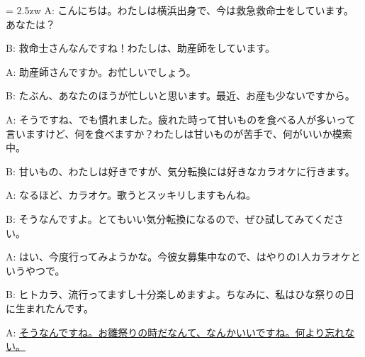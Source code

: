 \documentclass[11pt]{amsart}
\title{}
\author{}
\newenvironment{hangall}[1]{\hangindent = 2.5zw\everypar{\hangindent = 2.5zw}}{}
\begin{document}
\maketitle
\begin{hangall}{}%
A: こんにちは。わたしは横浜出身で、今は救急救命士をしています。あなたは？

B: 救命士さんなんですね！わたしは、助産師をしています。

A: 助産師さんですか。お忙しいでしょう。

B: たぶん、あなたのほうが忙しいと思います。最近、お産も少ないですから。

A: そうですね、でも慣れました。疲れた時って甘いものを食べる人が多いって言いますけど、何を食べますか？わたしは甘いものが苦手で、何がいいか模索中。

B: 甘いもの、わたしは好きですが、気分転換には好きなカラオケに行きます。

A: なるほど、カラオケ。歌うとスッキリしますもんね。

B: そうなんですよ。とてもいい気分転換になるので、ぜひ試してみてください。

A: はい、今度行ってみようかな。今彼女募集中なので、はやりの1人カラオケというやつで。

B: ヒトカラ、流行ってますし十分楽しめますよ。ちなみに、私はひな祭りの日に生まれたんです。

A: \ul{そうなんですね。お雛祭りの時だなんて、なんかいいですね。何より忘れない。}\end{hangall}
\end{document}
